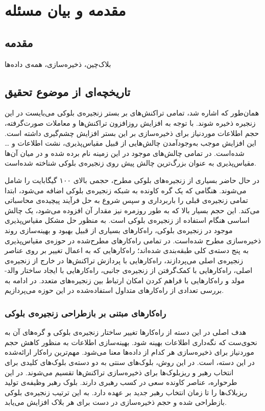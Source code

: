 
\chapter{مقدمه و بیان مسئله}
\section{مقدمه}
بلاک‌چین،‌ ذخیره‌سازی، همه‌ی داده‌ها

\section{تاریخچه‌ای از موضوع تحقیق}
همان‌‌طور که اشاره شد، تمامی تراکنش‌های بر بستر زنجیره‌ی بلوکی می‌بایست در این زنجیره ذخیره شوند. با توجه به افزایش روزافزون تراکنش‌ها و معاملات صورت‌گرفته، حجم اطلاعات موردنیاز برای ذخیره‌سازی بر این بستر افزایش چشم‌گیری داشته است. این افزایش موجب به‌وجود‌آمدن چالش‌هایی از قبیل مقیاس‌پذیری، نشت اطلاعات و \dots شده‌است. در \cite{Lin2017}
تمامی چالش‌های موجود در این زمینه نام برده شده و در میان آن‌ها مقیاس‌پذیری به عنوان بزرگ‌ترین چالش پیش‌ روی زنجیر‌ه‌ی بلوکی شناخته شده‌است. 

در حال حاضر بسیاری از زنجیره‌های بلوکی مطرح، حجمی بالای ۱۰۰ گیگابایت را شامل می‌شوند. هنگامی که یک گره کاونده به شبکه زنجیره‌ی بلوکی اضافه می‌شود، ابتدا تمامی زنجیره‌ی قبلی را باربرداری و سپس شروع به حل فرآیند پیچیده‌ی محاسباتی می‌کند. این حجم بسیار بالا که به طور روزمره نیز مقدار آن افزوده می‌شود، یک چالش اساسی هنگام استفاده از زنجیره‌ی بلوکی است. \cite{Wang2018}
به منظور حل مشکل مقیاس‌پذیری موجود در زنجیره‌ی بلوکی، راه‌کارهای بسیاری از قبیل بهبود و بهینه‌سازی روند ذخیره‌سازی مطرح شده‌است.
در \cite{Kim2018} تمامی راه‌کارهای مطرح‌شده در حوزه‌ی مقیاس‌پذیری به پنج دسته‌ی کلی طبقه‌بندی شده‌اند؛ راه‌کارهایی که به اعمال تغییر بر روی عناصر زنجیره‌ی اصلی می‌پردازند، راه‌کارهایی با پردازش تراکنش‌ها در خارج از زنجیره‌ی اصلی، راه‌کارهایی با کمک‌گرفتن از زنجیره‌ی جانبی، راه‌کارهایی با ایجاد ساختار والد-مولد و راه‌کارهایی با فراهم کردن امکان ارتباط بین زنجیره‌های متعدد.
در ادامه به بررسی تعدادی از راه‌کارهای متداول استفاده‌شده در این حوزه می‌پردازیم.

\subsection{راه‌کارهای مبتنی بر بازطراحی زنجیره‌ی بلوکی}
هدف اصلی در این دسته از راه‌کارها تغییر ساختار زنجیره‌ی بلوکی و گره‌های آن به نحوی‌ست که نگه‌داری اطلاعات بهینه شود. بهینه‌سازی اطلاعات به منظور کاهش حجم موردنیاز برای ذخیره‌سازی هر کدام از داده‌ها معنا می‌شود. مهم‌ترین راه‌کار ارائه‌شده در این دسته، \cite{Eyal2015} است. در این روش، بلوک‌های سنتی به دو دسته‌ی بلوک‌های کلیدی برای انتخاب رهبر و ریزبلوک‌ها برای ذخیره‌سازی تراکنش‌ها تقسیم می‌شوند. در این طرحواره، عناصر کاونده سعی در کسب رهبری دارند. بلوک رهبر وظیفه‌ی تولید ریزبلاک‌ها را تا زمان انتخاب رهبر جدید بر عهده دارد. به این ترتیب زنجیره‌ی بلوکی بازطراحی شده و حجم ذخیره‌سازی در دست برای هر بلاک افزایش می‌یابد. 

